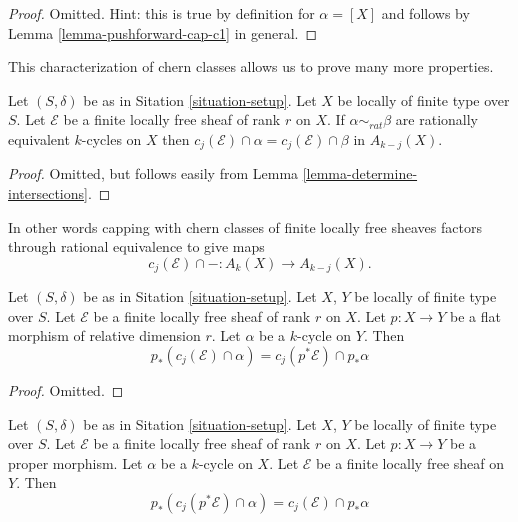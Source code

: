 \begin{proof}
Omitted. Hint: this is true by definition for
$\alpha = [X]$ and follows by Lemma \ref{lemma-pushforward-cap-c1}
in general.
\end{proof}

\noindent
This characterization of chern classes allows us to prove many more
properties.

\begin{lemma}
\label{lemma-cap-chern-class-factors-rational-equivalence}
Let $(S, \delta)$ be as in Sitation \ref{situation-setup}.
Let $X$ be locally of finite type over $S$.
Let $\mathcal{E}$ be a finite locally free sheaf of rank $r$ on $X$.
If $\alpha \sim_{rat} \beta$ are rationally equivalent $k$-cycles
on $X$ then $c_j(\mathcal{E}) \cap \alpha = c_j(\mathcal{E}) \cap \beta$
in $A_{k - j}(X)$.
\end{lemma}

\begin{proof}
Omitted, but follows easily from Lemma \ref{lemma-determine-intersections}.
\end{proof}

\noindent
In other words capping with chern classes of
finite locally free sheaves factors through rational equivalence
to give maps
$$
c_j(\mathcal{E}) \cap - : A_k(X) \to A_{k - j}(X).
$$

\begin{lemma}
\label{lemma-flat-pushback-cap-cj}
Let $(S, \delta)$ be as in Sitation \ref{situation-setup}.
Let $X$, $Y$ be locally of finite type over $S$.
Let $\mathcal{E}$ be a finite locally free sheaf of rank $r$ on $X$.
Let $p : X \to Y$ be a flat morphism of relative dimension $r$.
Let $\alpha$ be a $k$-cycle on $Y$.
Then
$$
p_*(c_j(\mathcal{E}) \cap \alpha) = c_j(p^*\mathcal{E}) \cap p_*\alpha
$$
\end{lemma}

\begin{proof}
Omitted.
\end{proof}

\begin{lemma}
\label{lemma-pushforward-cap-cj}
Let $(S, \delta)$ be as in Sitation \ref{situation-setup}.
Let $X$, $Y$ be locally of finite type over $S$.
Let $\mathcal{E}$ be a finite locally free sheaf of rank $r$ on $X$.
Let $p : X \to Y$ be a proper morphism.
Let $\alpha$ be a $k$-cycle on $X$.
Let $\mathcal{E}$ be a finite locally free sheaf on $Y$.
Then
$$
p_*(c_j(p^*\mathcal{E}) \cap \alpha) = c_j(\mathcal{E}) \cap p_*\alpha
$$
\end{lemma}

